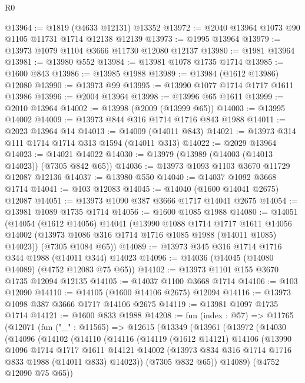 \begin{lexlean}{R0}
\begin{coremodule}
@13964 := @1819 (@4633 @12131) @13352
@13972 := @2040 @13964 @1073 @90 @1105 @11731 @1714 @12138 @12139
@13973 := @1995 @13964
@13979 := @13973 @1079 @1104 @3666 @11730 @12080 @12137
@13980 := @1981 @13964
@13981 := @13980 @552
@13984 := @13981 @1078 @1735 @1714
@13985 := @1600 @843
@13986 := @13985 @1988
@13989 := @13984 (@1612 @13986) @12080
@13990 := @13973 @99
@13995 := @13990 @1077 @1714 @1717 @1611 @13986
@13996 := @2004 @13964
@13998 := @13996 @65 @1611
@13999 := @2010 @13964
@14002 := @13998 (@2009 (@13999 @65))
@14003 := @13995 @14002
@14009 := @13973 @844 @316 @1714 @1716 @843 @1988
@14011 := @2023 @13964 @14
@14013 := @14009 (@14011 @843)
@14021 := @13973 @314 @111 @1714 @1714 @313 @1594 (@14011 @313)
@14022 := @2029 @13964
@14023 := @14021 @14022
@14030 := @13979 (@13989 (@14003 (@14013 @14023)) (@7305 @842 @65))
@14036 := @13973 @1093 @1103 @3670 @11729 @12087 @12136
@14037 := @13980 @550
@14040 := @14037 @1092 @3668 @1714
@14041 := @103 @12083
@14045 := @14040 (@1600 @14041 @2675) @12087
@14051 := @13973 @1090 @387 @3666 @1717 @14041 @2675
@14054 := @13981 @1089 @1735 @1714
@14056 := @1600 @1085 @1988
@14080 := @14051
    (@14054
      (@1612 @14056)
      @14041
      (@13990
        @1088
        @1714
        @1717
        @1611
        @14056
        @14002
        (@13973 @1086 @316 @1714 @1716 @1085 @1988 (@14011 @1085) @14023))
      (@7305 @1084 @65))
@14089 := @13973 @345 @316 @1714 @1716 @344 @1988 (@14011 @344) @14023
@14096 := @14036 (@14045 (@14080 @14089) (@4752 @12083 @75 @65))
@14102 := @13973 @1101 @155 @3670 @1735 @12094 @12135
@14105 := @14037 @1100 @3668 @1714
@14106 := @103 @12090
@14110 := @14105 (@1600 @14106 @2675) @12094
@14116 := @13973 @1098 @387 @3666 @1717 @14106 @2675
@14119 := @13981 @1097 @1735 @1714
@14121 := @1600 @833 @1988
@14208 := fun (index : @57) =>
  @11765
    (@12071
      (fun ("_" : @11565) =>
      @12615
        (@13349
          (@13961
            (@13972
              (@14030
                (@14096
                  (@14102
                    (@14110
                      (@14116
                        (@14119
                          (@1612 @14121)
                          @14106
                          (@13990
                            @1096
                            @1714
                            @1717
                            @1611
                            @14121
                            @14002
                            (@13973 @834 @316 @1714 @1716 @833 @1988 (@14011 @833) @14023))
                          (@7305 @832 @65))
                        @14089)
                      (@4752 @12090 @75 @65))

\end{coremodule}
\end{lexlean}
